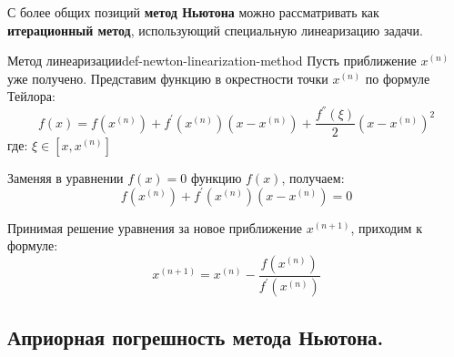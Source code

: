 \documentclass[14pt]{extarticle}
\begin{document}
    С более общих позиций \textbf{метод Ньютона} можно рассматривать как \textbf{итерационный метод}, использующий специальную линеаризацию задачи.

    \begin{definition}{Метод линеаризации}{def-newton-linearization-method}
        Пусть приближение $x^{(n)}$ уже получено. Представим функцию в окрестности точки $x^{(n)}$ по формуле Тейлора:
        $$f(x) = f(x^{(n)}) + f^{'}(x^{(n)})(x - x^{(n)}) + \frac{f^{''}(\xi)}{2}(x - x^{(n)})^{2}$$
        где: $\xi \in [x, x^{(n)}]$
        
        \vspace{\baselineskip}

        Заменяя в уравнении $f(x) = 0$ функцию $f(x)$, получаем:
        $$f(x^{(n)}) + f^{'}(x^{(n)})(x - x^{(n)}) = 0$$

        Принимая решение уравнения за новое приближение $x^{(n + 1)}$, приходим к формуле:
        $$x^{(n + 1)} = x^{(n)} - \frac{f(x^{(n)})}{f^{'}(x^{(n)})}$$
    \end{definition}

\clearpage
\subsection{Априорная погрешность метода Ньютона.}
\end{document}
